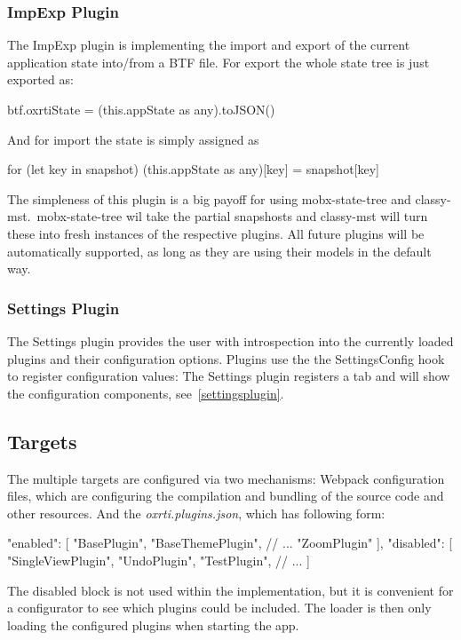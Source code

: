 \subsubsection{ImpExp Plugin }
The ImpExp plugin is implementing the import and export of the current
application state into/from a BTF file. For export the whole state tree is just
exported as:
\begin{typescript}
btf.oxrtiState = (this.appState as any).toJSON()
\end{typescript}
And for import the state is simply assigned as
\begin{typescript}
for (let key in snapshot)
   (this.appState as any)[key] = snapshot[key]
\end{typescript}
The simpleness of this plugin is a big payoff for using mobx-state-tree and
classy-mst.\ mobx-state-tree wil take the partial snapshosts and classy-mst will
turn these into fresh instances of the respective plugins. All future plugins will be automatically supported, as long as they
are using their models in the default way.

\subsubsection{Settings Plugin}
The Settings plugin provides the user with introspection into the currently loaded
plugins and their configuration options. Plugins use the the SettingsConfig hook
to register configuration values:
The Settings plugin registers a tab and will show the configuration components,
see~\autoref{settingsplugin}.


\subsection{Targets}\label{sec_apps}
The multiple targets are configured via two mechanisms:
Webpack configuration files, which are configuring the compilation and bundling of the
source code and other resources. And the \emph{oxrti.plugins.json}, which has following form:
\begin{typescript}
{
    "enabled": [
        "BasePlugin",
        "BaseThemePlugin",
        // ...
        "ZoomPlugin"
    ],
    "disabled": [
        "SingleViewPlugin",
        "UndoPlugin",
        "TestPlugin",
        // ...
    ]
}
\end{typescript}
The disabled block is not used within the implementation, but it is convenient
for a configurator to see which plugins could be included. The loader is then
only loading the configured plugins when starting the app.

